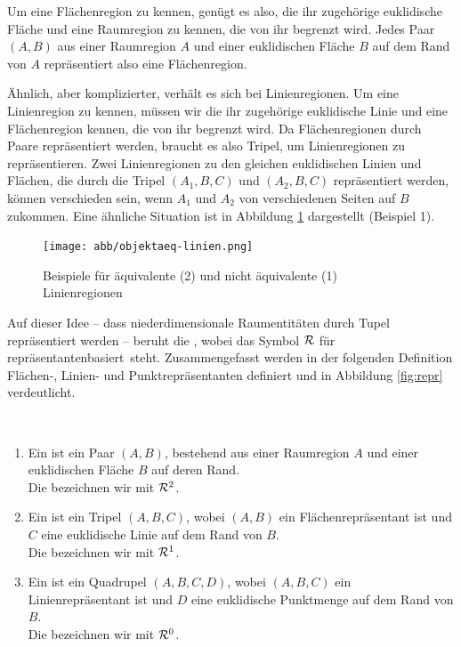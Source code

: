         Um eine Flächenregion zu kennen, genügt es also, die ihr zugehörige euklidische Fläche und eine Raumregion zu kennen, die von ihr begrenzt wird.
        Jedes Paar $(A,B)$ aus einer Raumregion $A$ und einer euklidischen Fläche $B$ auf dem Rand von $A$ repräsentiert also eine Flächenregion.

        Ähnlich, aber komplizierter, verhält es sich bei Linienregionen. 
        Um eine Linienregion zu kennen, müssen wir die ihr zugehörige euklidische Linie und eine Flächenregion kennen, die von ihr begrenzt wird. 
        Da Flächenregionen durch Paare repräsentiert werden, braucht es also Tripel, um Linienregionen zu repräsentieren.
        Zwei Linienregionen zu den gleichen euklidischen Linien und Flächen, die durch die Tripel $(A_1, B, C)$ und $(A_2, B, C)$ repräsentiert werden, können verschieden sein, wenn $A_1$ und $A_2$ von verschiedenen Seiten auf $B$ zukommen. 
        Eine ähnliche Situation ist in Abbildung \ref{fig:objektaeq-linien} dargestellt (Beispiel 1).

        \begin{figure}[ht]
            \centering
            \texttt{[image: abb/objektaeq-linien.png]}
            \caption{Beispiele für äquivalente (2) und nicht äquivalente (1) Linienregionen}
            \label{fig:objektaeq-linien}
        \end{figure}
        
        Auf dieser Idee -- dass niederdimensionale Raumentitäten durch Tupel repräsentiert werden -- beruht die \strukt, wobei das Symbol $\mathcal{R}$ für \glqq repräsentantenbasiert\grqq\ steht.
        Zusammengefasst werden in der folgenden Definition Flächen-, Linien- und Punktrepräsentanten definiert und in Abbildung \ref{fig:repr} verdeutlicht.

        \begin{dfn}[Repräsentanten]\ \vspace{0pt}
            \begin{enumerate}
                \item Ein  ist ein Paar $(A,B)$, 
                    bestehend aus einer Raumregion $A$ und einer euklidischen Fläche $B$ auf deren Rand.\\
                    Die  bezeichnen wir mit $\mathcal{R}^2$.
                \item Ein  ist ein Tripel $(A,B,C)$, 
                    wobei $(A,B)$ ein Flächenrepräsentant ist und $C$ eine euklidische Linie auf dem Rand von $B$.\\
                    Die  bezeichnen wir mit $\mathcal{R}^1$.
                \item Ein  ist ein Quadrupel $(A,B,C,D)$, 
                    wobei $(A,B,C)$ ein Linienrepräsentant ist und $D$ eine euklidische Punktmenge auf dem Rand von $B$.\\
                    Die  bezeichnen wir mit $\mathcal{R}^0$.
            \end{enumerate}
        \end{dfn}


